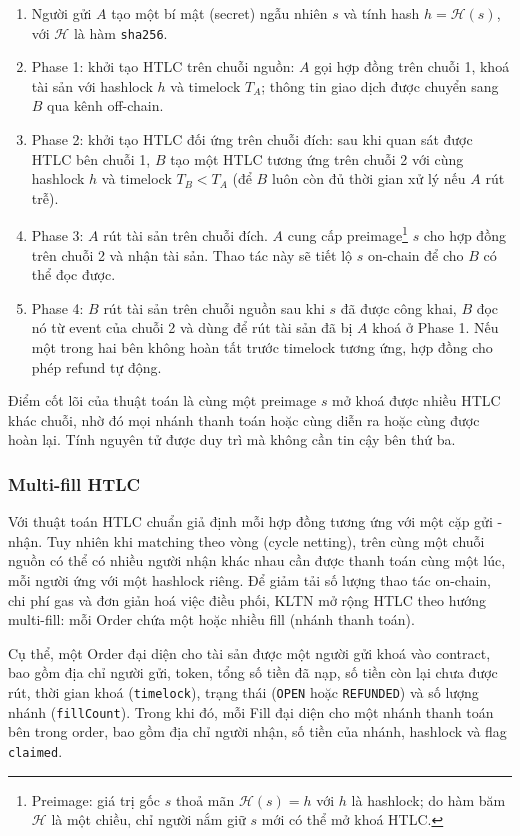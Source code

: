 \begin{enumerate}
  \item Người gửi $A$ tạo một bí mật (secret) ngẫu nhiên $s$ và tính hash $h = \mathcal{H}(s)$, với $\mathcal{H}$ là hàm \texttt{sha256}.
  \item Phase 1: khởi tạo HTLC trên chuỗi nguồn: $A$ gọi hợp đồng trên chuỗi 1, khoá tài sản với hashlock $h$ và timelock $T_A$; thông tin giao dịch được chuyển sang $B$ qua kênh off-chain.
  \item Phase 2: khởi tạo HTLC đối ứng trên chuỗi đích: sau khi quan sát được HTLC bên chuỗi 1, $B$ tạo một HTLC tương ứng trên chuỗi 2 với cùng hashlock $h$ và timelock $T_B < T_A$ (để $B$ luôn còn đủ thời gian xử lý nếu $A$ rút trễ).
  \item Phase 3: $A$ rút tài sản trên chuỗi đích. $A$ cung cấp preimage\footnote{Preimage: giá trị gốc $s$ thoả mãn $\mathcal{H}(s) = h$ với $h$ là hashlock; do hàm băm $\mathcal{H}$ là một chiều, chỉ người nắm giữ $s$ mới có thể mở khoá HTLC.} $s$ cho hợp đồng trên chuỗi 2 và nhận tài sản. Thao tác này sẽ tiết lộ $s$ on-chain để cho $B$ có thể đọc được.
  \item Phase 4: $B$ rút tài sản trên chuỗi nguồn sau khi $s$ đã được công khai, $B$ đọc nó từ event của chuỗi 2 và dùng để rút tài sản đã bị $A$ khoá ở Phase 1. Nếu một trong hai bên không hoàn tất trước timelock tương ứng, hợp đồng cho phép refund tự động.
\end{enumerate}

Điểm cốt lõi của thuật toán là cùng một preimage $s$ mở khoá được nhiều HTLC khác chuỗi,
nhờ đó mọi nhánh thanh toán hoặc cùng diễn ra hoặc cùng được hoàn lại.
Tính nguyên tử được duy trì mà không cần tin cậy bên thứ ba.

\subsubsection{Multi-fill HTLC}

Với thuật toán HTLC chuẩn giả định mỗi hợp đồng tương ứng với một cặp gửi - nhận. 
Tuy nhiên khi matching theo vòng (cycle netting), 
trên cùng một chuỗi nguồn có thể có nhiều người nhận khác nhau cần 
được thanh toán cùng một lúc, mỗi người ứng với một hashlock riêng. 
Để giảm tải số lượng thao tác on-chain, chi phí gas và đơn giản hoá việc điều phối, 
KLTN mở rộng HTLC theo hướng multi-fill: mỗi Order
chứa một hoặc nhiều fill (nhánh thanh toán).

Cụ thể, một Order đại diện cho tài sản được một người gửi khoá vào 
contract, bao gồm địa chỉ người gửi, token, tổng số tiền đã nạp, 
số tiền còn lại chưa được rút, thời gian khoá 
(\texttt{timelock}), trạng thái (\texttt{OPEN} hoặc \texttt{REFUNDED}) 
và số lượng nhánh (\texttt{fillCount}). 
Trong khi đó, mỗi Fill đại diện cho một nhánh thanh toán bên
trong order, bao gồm địa chỉ người nhận, số tiền của nhánh, hashlock và
flag \texttt{claimed}.

